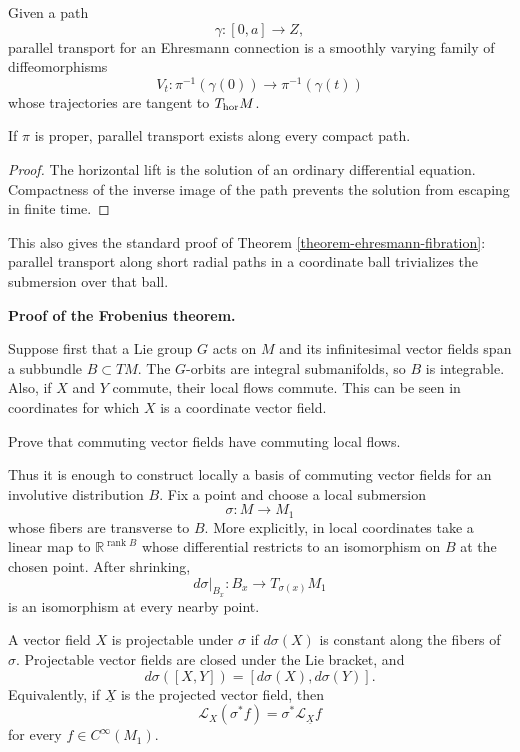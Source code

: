 Given a path
$$
\gamma:[0,a]\longrightarrow Z,
$$
parallel transport for an Ehresmann
connection is a smoothly varying family of
diffeomorphisms
$$
V_t:\pi^{-1}(\gamma(0))
\longrightarrow\pi^{-1}(\gamma(t))
$$
whose trajectories are tangent to
$T_{\rm hor}M$.

\begin{proposition}
\label{proposition-ehresmann-transport}
If $\pi$ is proper, parallel transport
exists along every compact path.
\end{proposition}

\begin{proof}
The horizontal lift is the solution of an
ordinary differential equation. Compactness
of the inverse image of the path prevents
the solution from escaping in finite time.
\end{proof}

This also gives the standard proof of
Theorem \ref{theorem-ehresmann-fibration}:
parallel transport along short radial paths
in a coordinate ball trivializes the
submersion over that ball.

\medskip\noindent
{\bf Proof of the Frobenius theorem.}

Suppose first that a Lie group $G$ acts on
$M$ and its infinitesimal vector fields span
a subbundle $B\subset TM$. The $G$-orbits
are integral submanifolds, so $B$ is
integrable. Also, if $X$ and $Y$ commute,
their local flows commute. This can be seen
in coordinates for which $X$ is a coordinate
vector field.

\begin{exercise}
\label{exercise-commuting-flows}
Prove that commuting vector fields have
commuting local flows.
\end{exercise}

Thus it is enough to construct locally a
basis of commuting vector fields for an
involutive distribution $B$. Fix a point
and choose a local submersion
$$
\sigma:M\longrightarrow M_1
$$
whose fibers are transverse to $B$. More
explicitly, in local coordinates take a
linear map to
$\mathbb{R}^{\operatorname{rank}B}$ whose
differential restricts to an isomorphism on
$B$ at the chosen point. After shrinking,
$$
d\sigma|_{B_x}:B_x
\longrightarrow T_{\sigma(x)}M_1
$$
is an isomorphism at every nearby point.

A vector field $X$ is projectable under
$\sigma$ if $d\sigma(X)$ is constant along
the fibers of $\sigma$. Projectable vector
fields are closed under the Lie bracket,
and
$$
d\sigma([X,Y])
=[d\sigma(X),d\sigma(Y)].
$$
Equivalently, if $\underline{X}$ is the
projected vector field, then
$$
\mathcal{L}_X(\sigma^*f)
=\sigma^*\mathcal{L}_{\underline{X}}f
$$
for every $f\in C^\infty(M_1)$.

